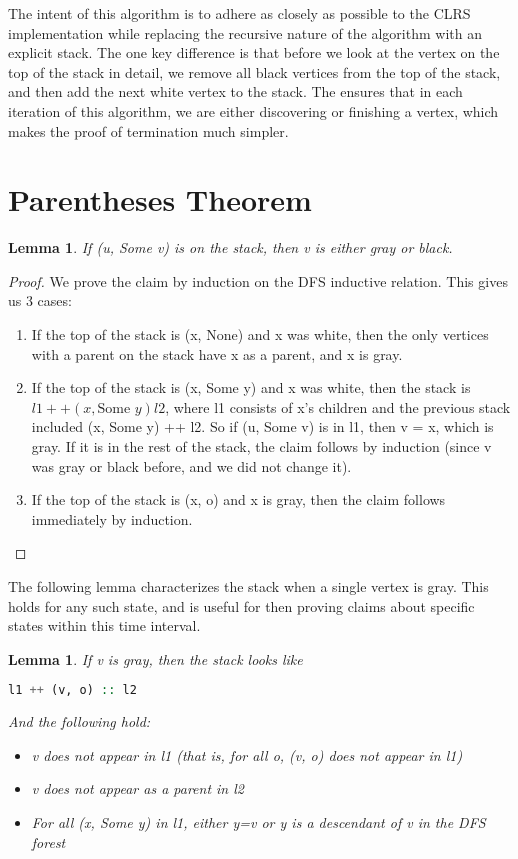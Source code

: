 \documentclass{article}
\newtheorem{lemma}[theorem]{Lemma}
\begin{document}
The intent of this algorithm is to adhere as closely as possible to the CLRS implementation while replacing the recursive nature of the algorithm with an explicit stack. The one key difference is that before we look at the vertex on the top of the stack in detail, we remove all black vertices from the top of the stack, and then add the next white vertex to the stack. The ensures that in each iteration of this algorithm, we are either discovering or finishing a vertex, which makes the proof of termination much simpler.
\section{Parentheses Theorem}
\begin{lemma}
If (u, Some v) is on the stack, then v is either gray or black.
\end{lemma}
\begin{proof}
We prove the claim by induction on the DFS inductive relation. This gives us 3 cases:
\begin{enumerate}
\item
If the top of the stack is (x, None) and x was white, then the only vertices with a parent on the stack have x as a parent, and x is gray.
\item
If the top of the stack is (x, Some y) and x was white, then the stack is $l1 ++ (x, \text{Some }y) l2$, where l1 consists of x's children and the previous stack included (x, Some y) ++ l2. So if (u, Some v) is in l1, then v = x, which is gray. If it is in the rest of the stack, the claim follows by induction (since v was gray or black before, and we did not change it).
\item
If the top of the stack is (x, o) and x is gray, then the claim follows immediately by induction.
\end{enumerate}
\end{proof}
The following lemma characterizes the stack when a single vertex is gray. This holds for any such state, and is useful for then proving claims about specific states within this time interval.
\begin{lemma}
If v is gray, then the stack looks like
\begin{lstlisting}[language=Haskell]
l1 ++ (v, o) :: l2
\end{lstlisting}
And the following hold:
\begin{itemize}
\item
v does not appear in l1 (that is, for all o, (v, o) does not appear in l1)
\item
v does not appear as a parent in l2
\item
For all (x, Some y) in l1, either y=v or y is a descendant of v in the DFS forest
\end{itemize}
\end{lemma}
\end{document}
